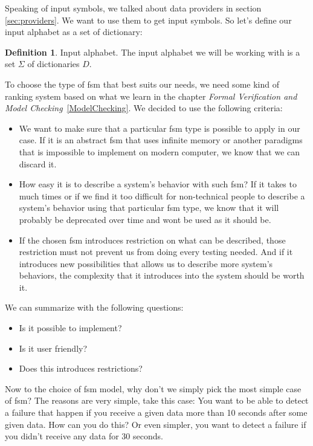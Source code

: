 \documentclass[12pt]{article}
\theoremstyle{definition}
\newtheorem{definition}{Definition}[section]
\theoremstyle{definition}
\theoremstyle{remark}
\begin{document}
Speaking of input symbols, we talked about data providers in section \ref{sec:providers}. We want to use them to get input symbols. So let's define our input alphabet as a set of dictionary:

\theoremstyle{definition}
\begin{definition}{Input alphabet.} The input alphabet we will be working with is a set $\Sigma$ of dictionaries $D$.
\end{definition}

To choose the type of \gls{fsm} that best suits our needs, we need some kind of ranking system based on what we learn in the chapter \textit{Formal Verification and Model Checking}~\ref{ModelChecking}. We decided to use the following criteria:
\begin{itemize}
\item We want to make sure that a particular \gls{fsm} type is possible to apply in our case. If it is an abstract \gls{fsm} that uses infinite memory or another paradigms that is impossible to implement on modern computer, we know that we can discard it.
\item How easy it is to describe a system's behavior with such \gls{fsm}? If it takes to much times or if we find it too difficult for non-technical people to describe a system's behavior using that particular \gls{fsm} type, we know that it will probably be deprecated over time and wont be used as it should be.
\item If the chosen \gls{fsm} introduces restriction on what can be described, those restriction must not prevent us from doing every testing needed. And if it introduces new possibilities that allows us to describe more system's behaviors, the complexity that it introduces into the system should be worth it.
\end{itemize}

We can summarize with the following questions:

\begin{itemize}
\item Is it possible to implement?
\item Is it user friendly?
\item Does this introduces restrictions?
\end{itemize}

Now to the choice of \gls{fsm} model, why don't we simply pick the most simple
case of \gls{fsm}? The reasons are very simple, take this case: You want to be
able to detect a failure that happen if you receive a given data more than 10
seconds after some given data. How can you do this? Or even simpler, you want
to detect a failure if you didn't receive any data for 30 seconds.\\
\end{document}
